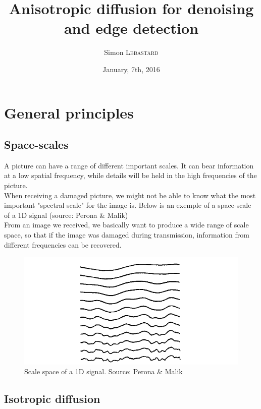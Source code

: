 \documentclass[12pt,a4paper]{article}
\begin{document}
	
	
	\title{Anisotropic diffusion for denoising and edge detection}
	\author{Simon \textsc{Lebastard}}
	\date{January, 7th, 2016}
	
\maketitle
	
\section{General principles}

\subsection{Space-scales}
A picture can have a range of different important scales. It can bear information at a low spatial frequency, while details will be held in the high frequencies of the picture.\\
When receiving a damaged picture, we might not be able to know what the most important "spectral scale" for the image is. Below is an exemple of a space-scale of a 1D signal (source: Perona \& Malik)
\\
From an image we received, we basically want to produce a wide range of scale space, so that if the image was damaged during transmission, information from different frequencies can be recovered.
\\
\begin{figure}[h]
	\centering
	\includegraphics[scale=0.5]{ScaleSpace_Example.png}
	\caption{Scale space of a 1D signal. Source: Perona \& Malik}
\end{figure}

\subsection{Isotropic diffusion}
\end{document}
